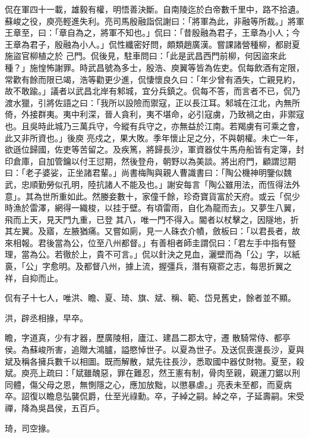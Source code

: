 \begin{pinyinscope}
 侃在軍四十一載，雄毅有權，明悟善決斷。自南陵迄於白帝數千里中，路不拾遺。蘇峻之役，庾亮輕進失利。亮司馬殷融詣侃謝曰：「將軍為此，非融等所裁。」將軍王章至，曰：「章自為之，將軍不知也。」侃曰：「昔殷融為君子，王章為小人；今王章為君子，殷融為小人。」侃性纖密好問，頗類趙廣漢。嘗課諸營種柳，都尉夏施盜官柳植之於
 己門。侃後見，駐車問曰：「此是武昌西門前柳，何因盜來此種？」施惶怖謝罪。時武昌號為多士，殷浩、庾翼等皆為佐吏。侃每飲酒有定限，常歡有餘而限已竭，浩等勸更少進，侃悽懷良久曰：「年少曾有酒失，亡親見約，故不敢踰。」議者以武昌北岸有邾城，宜分兵鎮之。侃每不答，而言者不已，侃乃渡水獵，引將佐語之曰：「我所以設險而禦寇，正以長江耳。邾城在江北，內無所倚，外接群夷。夷中利深，晉人貪利，夷不堪命，必引寇虜，乃致禍之由，非禦寇也。且吳時此城乃三萬兵守，今縱有兵守之，亦無益於江南。若羯虜有可乘之會，此又非所資也。」後庾
 亮戍之，果大敗。季年懷止足之分，不與朝權。未亡一年，欲遜位歸國，佐吏等苦留之。及疾篤，將歸長沙，軍資器仗牛馬舟船皆有定簿，封印倉庫，自加管鑰以付王愆期，然後登舟，朝野以為美談。將出府門，顧謂愆期曰：「老子婆娑，正坐諸君輩。」尚書梅陶與親人曹識書曰：「陶公機神明鑒似魏武，忠順勤勞似孔明，陸抗諸人不能及也。」謝安每言「陶公雖用法，而恆得法外意」。其為世所重如此。然媵妾數十，家僮千餘，珍奇寶貨富於天府。或云「侃少時漁於雷澤，網得一織梭，以挂于壁。有頃雷雨，自化為龍而去」。又夢生八翼，飛而上天，見天門九重，已登
 其八，唯一門不得入。閽者以杖擊之，因隧地，折其左翼。及寤，左腋猶痛。又嘗如廁，見一人硃衣介幘，斂板曰：「以君長者，故來相報。君後當為公，位至八州都督。」有善相者師圭謂侃曰：「君左手中指有豎理，當為公。若徹於上，貴不可言。」侃以針決之見血，灑壁而為「公」字，以紙裛，「公」字愈明。及都督八州，據上流，握彊兵，潛有窺窬之志，每思折翼之祥，自抑而止。



 侃有子十七人，唯洪、瞻、夏、琦、旗、斌、稱、範、岱見舊史，餘者並不顯。



 洪，辟丞相掾，早卒。



 瞻，字道真，少有才器，歷廣陵相，廬江、建昌二郡太守，遷
 散騎常侍、都亭侯。為蘇峻所害，追贈大鴻臚，謚愍悼世子。以夏為世子。及送侃喪還長沙，夏與斌及稱各擁兵數千以相圖。既而解散，斌先往長沙，悉取國中器仗財物。夏至，殺斌。庾亮上疏曰：「斌雖醜惡，罪在難忍，然王憲有制，骨肉至親，親運刀鋸以刑同體，傷父母之恩，無惻隱之心，應加放黜，以懲暴虐。」亮表未至都，而夏病卒。詔復以瞻息弘襲侃爵，仕至光祿勳。卒，子綽之嗣。綽之卒，子延壽嗣。宋受禪，降為吳昌侯，五百戶。



 琦，司空掾。




\end{pinyinscope}
